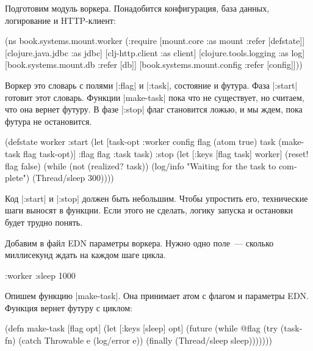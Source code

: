 Подготовим модуль воркера. Понадобится конфигурация, база данных, логирование и
HTTP-клиент:

\begin{english}
  \begin{clojure}
(ns book.systems.mount.worker
  (:require
   [mount.core :as mount :refer [defstate]]
   [clojure.java.jdbc :as jdbc]
   [clj-http.client :as client]
   [clojure.tools.logging :as log]
   [book.systems.mount.db :refer [db]]
   [book.systems.mount.config :refer [config]]))
  \end{clojure}
\end{english}

Воркер это словарь с полями \spverb|:flag| и \spverb|:task|, состояние и
футура. Фаза \spverb|:start| готовит этот словарь. Функции \spverb|make-task|
пока что не существует, но считаем, что она вернет футуру. В фазе \spverb|:stop|
флаг становится ложью, и мы ждем, пока футура не остановится.

\begin{english}
  \begin{clojure}
(defstate worker
  :start
  (let [{task-opt :worker} config
        flag (atom true)
        task (make-task flag task-opt)]
    {:flag flag :task task})
  :stop
  (let [{:keys [flag task]} worker]
    (reset! flag false)
    (while (not (realized? task))
      (log/info "Waiting for the task to complete")
      (Thread/sleep 300))))
  \end{clojure}
\end{english}

Код \spverb|:start| и \spverb|:stop| должен быть небольшим. Чтобы упростить его,
технические шаги выносят в функции. Если этого не сделать, логику запуска и
остановки будет трудно понять.

Добавим в файл EDN параметры воркера. Нужно одно поле~--- сколько миллисекунд
ждать на каждом шаге цикла.

\begin{english}
  \begin{clojure}
{:worker {:sleep 1000}}
  \end{clojure}
\end{english}

Опишем функцию \spverb|make-task|. Она принимает атом с флагом и параметры
EDN. Функция вернет футуру с циклом:

\begin{english}
  \begin{clojure}
(defn make-task
  [flag opt]
  (let [{:keys [sleep]} opt]
    (future
      (while @flag
        (try
          (task-fn)
          (catch Throwable e
            (log/error e))
          (finally
            (Thread/sleep sleep)))))))
  \end{clojure}
\end{english}

